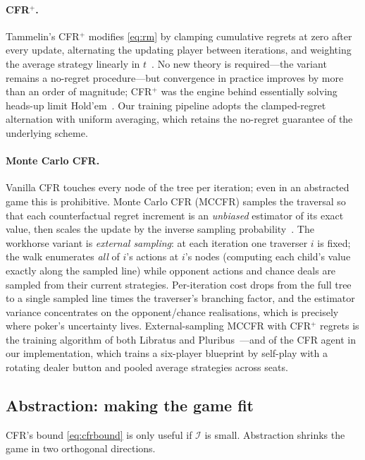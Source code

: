 \paragraph{CFR$^{+}$.} Tammelin's CFR$^{+}$ modifies \eqref{eq:rm} by clamping cumulative regrets at zero after every update, alternating the updating player between iterations, and weighting the average strategy linearly in $t$~\cite{tammelin2015cfrplus}. No new theory is required---the variant remains a no-regret procedure---but convergence in practice improves by more than an order of magnitude; CFR$^{+}$ was the engine behind essentially solving heads-up limit Hold'em~\cite{bowling2015ceph}. Our training pipeline adopts the clamped-regret alternation with uniform averaging, which retains the no-regret guarantee of the underlying scheme.

\paragraph{Monte Carlo CFR.} Vanilla CFR touches every node of the tree per iteration; even in an abstracted game this is prohibitive. Monte Carlo CFR (MCCFR) samples the traversal so that each counterfactual regret increment is an \emph{unbiased} estimator of its exact value, then scales the update by the inverse sampling probability~\cite{lanctot2009monte}. The workhorse variant is \emph{external sampling}: at each iteration one traverser $i$ is fixed; the walk enumerates \emph{all} of $i$'s actions at $i$'s nodes (computing each child's value exactly along the sampled line) while opponent actions and chance deals are sampled from their current strategies. Per-iteration cost drops from the full tree to a single sampled line times the traverser's branching factor, and the estimator variance concentrates on the opponent/chance realisations, which is precisely where poker's uncertainty lives. External-sampling MCCFR with CFR$^{+}$ regrets is the training algorithm of both Libratus and Pluribus~\cite{brown2017libratus,brown2019pluribus}---and of the CFR agent in our implementation, which trains a six-player blueprint by self-play with a rotating dealer button and pooled average strategies across seats.

\subsection{Abstraction: making the game fit}\label{sec:abstraction}

CFR's bound \eqref{eq:cfrbound} is only useful if $\mathcal{I}$ is small. Abstraction shrinks the game in two orthogonal directions.

